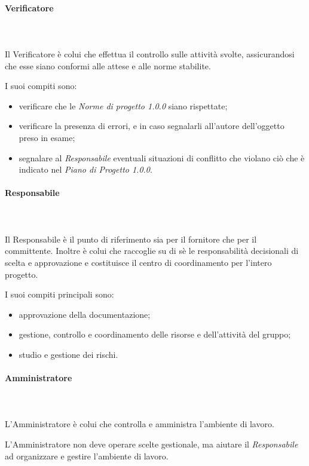    			\paragraph{Verificatore} \mbox{}\\ \mbox{}\\
   			Il Verificatore è colui che effettua il controllo sulle attività svolte, assicurandosi che esse siano conformi alle attese e alle norme stabilite.

   			I suoi compiti sono:
   			\begin{itemize}
   				\item verificare che le \textit{Norme di progetto 1.0.0\docs} siano rispettate;
   				\item verificare la presenza di errori, e in caso segnalarli all'autore dell'oggetto preso in esame;
   				\item segnalare al \textit{Responsabile} eventuali situazioni di conflitto che violano ciò che è indicato nel \textit{Piano di Progetto 1.0.0\docs}.
   			\end{itemize}
   			\paragraph{Responsabile} \mbox{}\\ \mbox{}\\
   			Il Responsabile è il punto di riferimento sia per il fornitore che per il committente. Inoltre è colui che raccoglie su di sè le responsabilità decisionali di scelta e approvazione e costituisce il centro di coordinamento per l'intero progetto.

   			I suoi compiti principali sono:
   			\begin{itemize}
   				\item approvazione della documentazione;
   				\item gestione, controllo e coordinamento delle risorse e dell'attività del gruppo;
   				\item studio e gestione dei rischi.
   			\end{itemize}
   			\paragraph{Amministratore} \mbox{}\\ \mbox{}\\
   			L'Amministratore è colui che controlla e amministra l'ambiente di lavoro.

   			L'Amministratore non deve operare scelte gestionale, ma aiutare il \textit{Responsabile} ad organizzare e gestire l'ambiente di lavoro.

